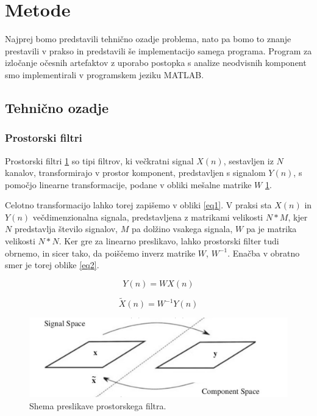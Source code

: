 \documentclass[9pt]{IEEEtran}
\begin{document}
\section{Metode}

Najprej bomo predstavili tehnično ozadje problema, nato pa bomo to znanje prestavili v prakso in predstavili še implementacijo samega programa. Program za izločanje očesnih artefaktov z uporabo postopka s analize neodvisnih komponent smo implementirali v programskem jeziku MATLAB.

\subsection{Tehnično ozadje}

\subsubsection{Prostorski filtri}

Prostorski filtri \ref{fig_1} so tipi filtrov, ki večkratni signal $X(n)$, sestavljen iz $N$ kanalov, transformirajo v prostor komponent, predstavljen s signalom $Y(n)$, s pomočjo linearne transformacije, podane v obliki mešalne matrike $W$ \ref{fig_1}.

Celotno transformacijo lahko torej zapišemo v obliki \ref{eq1}. V praksi sta $X(n)$ in $Y(n)$ večdimenzionalna signala, predstavljena z matrikami velikosti $N*M$, kjer $N$ predstavlja število signalov, $M$ pa dolžino vsakega signala, $W$ pa je matrika velikosti $N*N$. Ker gre za linearno preslikavo, lahko prostorski filter tudi obrnemo, in sicer tako, da poiščemo inverz matrike $W$, $W^{-1}$. Enačba v obratno smer je torej oblike \ref{eq2}. 

\begin{equation} \label{eq1}
Y(n) = WX(n)
\end{equation}

\begin{equation} \label{eq2}
\tilde{X}(n) = W^{-1}Y(n)
\end{equation}


\begin{figure}[!htb]
\centering
\includegraphics[width=1\columnwidth]{spatial_filter.png}
\caption[c1]{ Shema preslikave prostorskega filtra. }
\label{fig_1}
\end{figure}
\end{document}
